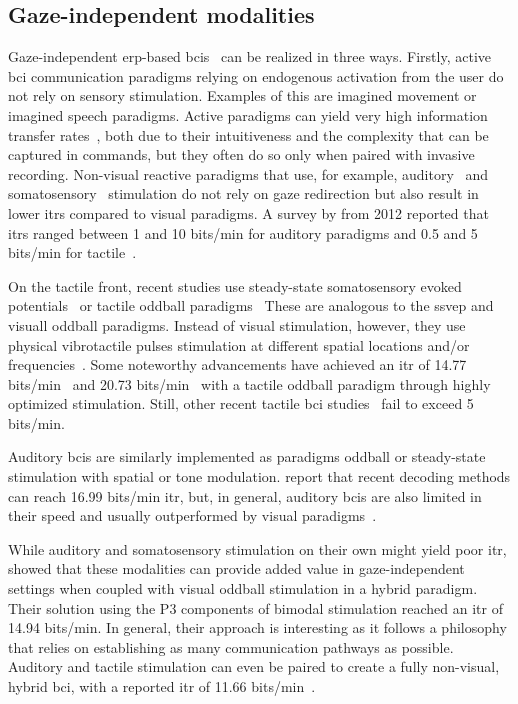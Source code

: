 \subsection{Gaze-independent modalities}
Gaze-independent \ac{erp}-based \acp{bci}~\cite{Riccio2012, Aloise2012} can be realized in three
ways.
Firstly, active \ac{bci} communication paradigms relying on endogenous activation from the user
do not rely on sensory stimulation.
Examples of this are imagined movement or imagined speech paradigms.
Ac\-tive paradigms can yield very high information transfer
rates~\cite{Willett2021,Metzger2023}, both due to their intuitiveness and the
complexity that can be captured in commands, but they often do so only when paired
with invasive recording.
Non-visual reactive paradigms that use, for example, auditory~\cite{Halder2010} and
somatosensory~\cite{Brouwer2010} stimulation do not rely on gaze redirection
but also result in lower \acp{itr} compared to visual paradigms.
A survey by \textcite{Riccio2012} from 2012 reported that \acp{itr} ranged between
1 and 10 bits/min for auditory paradigms and 0.5 and 5 bits/min for tactile~\cite{Riccio2012}.

On the tactile front, recent studies use steady-state somatosensory evoked
potentials~\cite{Petit2021} or tactile oddball paradigms~\cite{Waal2012}
These are analogous to the \ac{ssvep} and visuall oddball paradigms.
Instead of visual stimulation, however, they use physical vibrotactile pulses
stimulation at different spatial locations and/or frequencies~\cite{Han2020}.
Some noteworthy advancements have achieved an \ac{itr} of 14.77 bits/min~\cite{Liu2019}
and 20.73 bits/min~\cite{Herweg2016} with a tactile oddball paradigm through
highly optimized stimulation.
Still, other recent tactile \ac{bci} studies~\cite{Herweg2016a,Han2020,Jin2020,Li2019,Eidel2022}
fail to exceed 5 bits/min.

Auditory \acp{bci} are similarly implemented as paradigms oddball or
steady-state stimulation with spatial or tone modulation.
\textcite{Zhang2020} report that recent decoding methods can reach 16.99
bits/min \ac{itr}, but, in general, auditory \acp{bci} are also limited in
their speed and usually outperformed by visual paradigms~\cite{Rezeika2018}.

While auditory and somatosensory stimulation on their own might yield poor
\ac{itr}, \textcite{Yin2016} showed that these modalities can provide added
value in gaze-independent settings when coupled with visual oddball
stimulation in a hybrid paradigm.
Their solution using the P3 components of bimodal stimulation reached an \ac{itr} of 14.94 bits/min.
In general, their approach is interesting as it follows a philosophy that
relies on establishing as many communication pathways as possible.
Auditory and tactile stimulation can even be paired to create a fully
non-visual, hybrid \ac{bci}, with a reported \ac{itr} of 11.66 bits/min~\cite{Zhang2020}.

